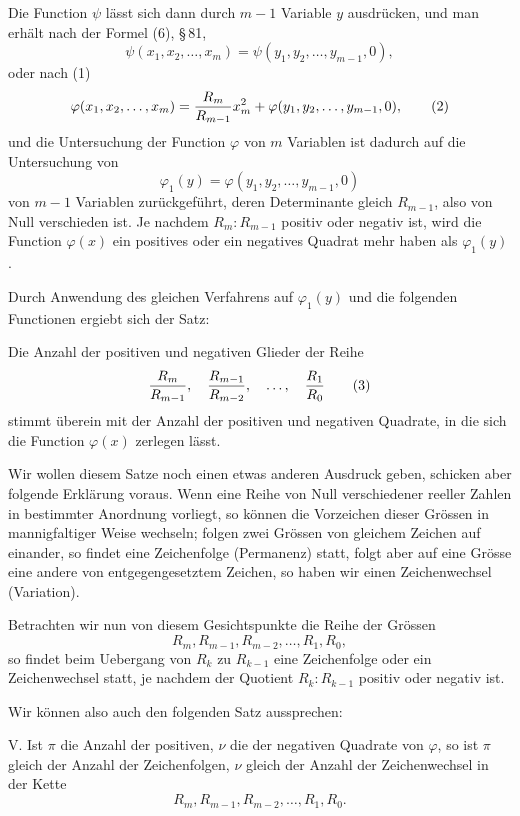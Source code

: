 \documentclass[11pt]{article}
\begin{document}
Die Function $\psi$ l\"asst sich dann durch $m-1$ Variable $y$ ausdr\"ucken, und man erh\"alt nach der Formel (6), \S\,81,
\[
        \psi(x_1,x_2,
\ldots,x_m)=\psi(y_1,y_2,
\ldots,y_{m-1},0),
\]
oder nach (1)
\begin{equation}
        \varphi(x_1,x_2,
\ldots,x_m)= {R_m\over R_{m-1}}x_m^2+
        \varphi(y_1,y_2,
\ldots,y_{m-1},0),
\tag{2}
\end{equation}
und die Untersuchung der Function $\varphi$ von $m$ Variablen ist dadurch auf die Untersuchung von
\[
        \varphi_1(y)=\varphi(y_1,y_2,
\ldots,y_{m-1},0)
\]
von $m-1$ Variablen zur\"uckgef\"uhrt, deren Determinante gleich $R_{m-1}$, also von Null verschieden ist. Je nachdem $R_m:R_{m-1}$ positiv oder negativ ist, wird die Function $\varphi(x)$ ein positives oder ein negatives Quadrat mehr haben als $\varphi_1(y)$.

Durch Anwendung des gleichen Verfahrens auf $\varphi_1(y)$ und die folgenden Functionen ergiebt sich der Satz:

Die Anzahl der positiven und negativen Glieder der Reihe
\begin{equation}
        {R_m\over R_{m-1}},\quad {R_{m-1}\over R_{m-2}},\quad \ldots,\quad {R_1\over R_0}
\tag{3}
\end{equation}
stimmt \"uberein mit der Anzahl der positiven und negativen Quadrate, in die sich die Function $\varphi(x)$ zerlegen l\"asst.

Wir wollen diesem Satze noch einen etwas anderen Ausdruck geben, schicken aber folgende Erkl\"arung voraus. Wenn eine Reihe von Null verschiedener reeller Zahlen in bestimmter Anordnung vorliegt, so k\"onnen die Vorzeichen dieser Gr\"ossen in mannigfaltiger Weise wechseln; folgen zwei Gr\"ossen von gleichem Zeichen auf einander, so findet eine Zeichenfolge (Permanenz) statt, folgt aber auf eine Gr\"osse eine andere von entgegengesetztem Zeichen, so haben wir einen Zeichenwechsel (Variation).

Betrachten wir nun von diesem Gesichtspunkte die Reihe der Gr\"ossen
\[
        R_m,
        R_{m-1},
        R_{m-2},
        \ldots,
        R_1,
        R_0,
\]
so findet beim Uebergang von $R_k$ zu $R_{k-1}$ eine Zeichenfolge oder ein Zeichenwechsel statt, je nachdem der Quotient $R_k:R_{k-1}$ positiv oder negativ ist.

Wir k\"onnen also auch den folgenden Satz aussprechen:

V. Ist $\pi$ die Anzahl der positiven, $\nu$ die der negativen Quadrate von $\varphi$, so ist $\pi$ gleich der Anzahl der Zeichenfolgen, $\nu$ gleich der Anzahl der Zeichenwechsel in der Kette
\begin{equation}
        R_m,
        R_{m-1},
        R_{m-2},
        \ldots,
        R_1,
        R_0.
\tag{4}
\end{equation}
\end{document}

